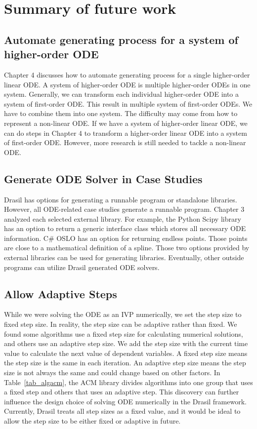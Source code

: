 \chapter{Summary of future work}

\section{Automate generating process for a system of higher-order ODE}
Chapter 4 discusses how to automate generating process for a single higher-order linear ODE. A system of higher-order ODE is multiple higher-order ODEs in one system. Generally, we can transform each individual higher-order ODE into a system of first-order ODE. This result in multiple system of first-order ODEs. We have to combine them into one system. The difficulty may come from how to represent a non-linear ODE. If we have a system of higher-order linear ODE, we can do steps in Chapter 4 to transform a higher-order linear ODE into a system of first-order ODE. However, more research is still needed to tackle a non-linear ODE.

\section{Generate ODE Solver in Case Studies}
Drasil has options for generating a runnable program or standalone libraries. However, all ODE-related case studies generate a runnable program. Chapter 3 analyzed each selected external library. For example, the Python Scipy library has an option to return a generic interface class which stores all necessary ODE information. C\# OSLO has an option for returning endless points. Those points are close to a mathematical definition of a spline. Those two options provided by external libraries can be used for generating libraries. Eventually, other outside programs can utilize Drasil generated ODE solvers.

\section{Allow Adaptive Steps}
While we were solving the ODE as an IVP numerically, we set the step size to fixed step size. In reality, the step size can be adaptive rather than fixed. We found some algorithms use a fixed step size for calculating numerical solutions, and others use an adaptive step size. We add the step size with the current time value to calculate the next value of dependent variables. A fixed step size means the step size is the same in each iteration. An adaptive step size means the step size is not always the same and could change based on other factors. In Table~\ref{tab_algacm}, the ACM library divides algorithms into one group that uses a fixed step and others that uses an adaptive step. This discovery can further influence the design choice of solving ODE numerically in the Drasil framework. Currently, Drasil treats all step sizes as a fixed value, and it would be ideal to allow the step size to be either fixed or adaptive in future.

